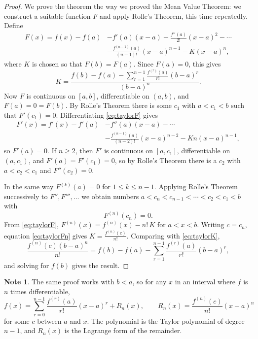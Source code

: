 \documentclass[11pt,a4paper]{article}
\numberwithin{equation}{section}
\theoremstyle{definition}
\newtheorem*{note}{Note}
\begin{document}
\begin{proof}
We prove the theorem the way we proved the Mean Value Theorem: we construct a suitable function $F$ and apply Rolle's Theorem, this time repeatedly. Define
\begin{equation}\label{eq:taylorF}
\begin{split}
F(x) = f(x) - f(a) &- f'(a) (x - a) - \frac{f''(a)}{2!} (x - a)^2 - \cdots \\
&-\frac{f^{(n - 1)} (a)}{(n - 1)!} (x - a)^{n - 1} - K (x -a)^n ,
\end{split}
\end{equation}
where $K$ is chosen so that $F(b) = F(a)$. Since $F(a) = 0$, this gives
\begin{equation}\label{eq:taylorK}
K = \frac{f(b) - f(a) -\sum_{r = 1}^{n - 1} \frac{f^{(r)} (a)}{r!} (b - a)^r}{(b - a)^n}.
\end{equation}
Now $F$ is continuous on $[a,b]$, differentiable on $(a,b)$, and $F(a) = 0 = F(b)$. By Rolle's Theorem there is some $c_1$ with $a < c_1 < b$ such that $F'(c_1) = 0$. Differentiating \eqref{eq:taylorF} gives
\begin{align*}
F'(x) = f'(x) - f'(a) &- f''(a) (x-a)-\cdots \\
&- \frac{f^{(n-1)} (a)}{(n - 2)!} (x - a)^{n - 2}- K n (x - a)^{n - 1},
\end{align*}
so $F'(a) = 0$. If $n\geq 2$, then $F'$ is continuous on $[a,c_1]$, differentiable on $(a,c_1)$, and $F'(a) = F'(c_1) = 0$, so by Rolle's Theorem there is a $c_2$ with $a< c_2 < c_1$ and $F''(c_2) = 0$.

In the same way $F^{(k)}(a) = 0$ for $1 \leq k \leq n - 1$. Applying Rolle's Theorem successively to $F'', F''', \dots$ we obtain numbers $a < c_n < c_{n-1} < \cdots < c_2 < c_1 < b$ with
\begin{equation}\label{eq:taylorFn}
F^{(n)}(c_n) = 0 .
\end{equation}
From \eqref{eq:taylorF}, $F^{(n)}(x) = f^{(n)}(x) - n!\,K$ for $a < x <b$. Writing $c = c_n$, equation \eqref{eq:taylorFn} gives $K = \frac{f^{(n)} (c)}{n!}$. Comparing with \eqref{eq:taylorK},
$$\frac{f^{(n)}(c) (b - a)^n}{n!} = f(b) - f(a) - \sum^{n - 1}_{r=1}\frac{f^{(r)}(a)}{r!} (b - a)^r ,$$
and solving for $f(b)$ gives the result.
\end{proof}

\begin{note}
The same proof works with $b<a$, so for any $x$ in an interval where $f$ is $n$ times differentiable,
$$f(x) = \sum_{r=0}^{n-1}\frac{f^{(r)}(a)}{r!}(x-a)^r + R_n(x), \qquad R_n(x) = \frac{f^{(n)}(c)}{n!}(x-a)^n$$
for some $c$ between $a$ and $x$. The polynomial is the Taylor polynomial of degree $n-1$, and $R_n(x)$ is the Lagrange form of the remainder.
\end{note}
\end{document}
